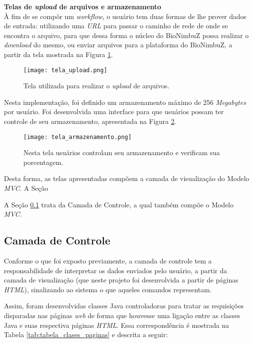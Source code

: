 \noindent
\textbf{Telas de \textit{upload} de arquivos e armazenamento} \\

\noindent
À fim de se compôr um \textit{workflow}, o usuário tem duas formas de lhe prover dados de entrada: utilizando uma \textit{URL} para passar o caminho de rede de onde se encontra o arquivo, para que dessa forma o núcleo do BioNimbuZ possa realizar o \textit{download} do mesmo, ou enviar arquivos para a plataforma do BioNimbuZ, a partir da tela mostrada na Figura \ref{fig:tela_upload}. 

\begin{figure}[H]
	\centering
	\texttt{[image: tela\_upload.png]}
	\caption{Tela utilizada para realizar o \textit{upload} de arquivos.}
	\label{fig:tela_upload}
\end{figure}

Nesta implementação, foi definido um armazenamento máximo de 256 \textit{Megabytes} por usuário. Foi desenvolvida uma interface para que usuários possam ter controle de seu armazenamento, apresentada na Figura \ref{fig:tela_armazenamento}.

\begin{figure}[H]
	\centering
	\texttt{[image: tela\_armazenamento.png]}
	\caption{Nesta tela usuários controlam seu armazenamento e verificam sua porcentagem.}
	\label{fig:tela_armazenamento}
\end{figure}

Desta forma, as telas apresentadas compõem a camada de visualização do Modelo \textit{MVC}. A Seção 

A Seção \ref{cap5sec3subsec2} trata da Camada de Controle, a qual também compõe o Modelo \textit{MVC}.

\subsection{Camada de Controle} \label{cap5sec3subsec2}

Conforme o que foi exposto previamente, a camada de controle tem a responsabilidade de interpretar os dados enviados pelo usuário, a partir da camada de visualização (que neste projeto foi desenvolvida a partir de páginas \textit{HTML}), sinalizando ao sistema o que aqueles comandos representam.

Assim, foram desenvolvidas classes Java controladoras para tratar as requisições disparadas nas páginas \textit{web} de forma que houvesse uma ligação entre as classes Java e suas respectiva páginas \textit{HTML}. Essa correspondência é mostrada na Tabela \ref{tab:tabela_clases_paginas} e descrita a seguir:

